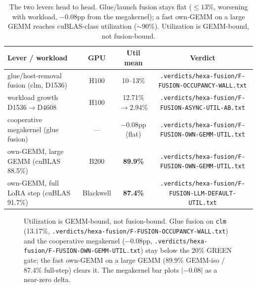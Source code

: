 \documentclass[11pt,a4paper]{article}
\newcommand{\vd}[1]{\texttt{.verdicts/hexa-fusion/#1.txt}}
\begin{document}
\begin{table}[h]
\centering
\small
\begin{tabular}{lccc}
\toprule
\textbf{Lever / workload} & \textbf{GPU} & \textbf{Util mean} & \textbf{Verdict} \\
\midrule
glue/host-removal fusion (clm, D1536)    & H100 & 10--13\%           & \vd{F-FUSION-OCCUPANCY-WALL} \\
\quad workload growth D1536$\to$D4608    & H100 & 12.71\%$\to$2.94\% & \vd{F-FUSION-ASYNC-UTIL-AB} \\
cooperative megakernel (glue fusion)     & ---  & $-0.08$pp (flat)   & \vd{F-FUSION-OWN-GEMM-UTIL} \\
own-GEMM, large GEMM (cuBLAS 88.5\%)     & B200 & \textbf{89.9\%}    & \vd{F-FUSION-OWN-GEMM-UTIL} \\
own-GEMM, full LoRA step (cuBLAS 91.7\%) & Blackwell & \textbf{87.4\%} & \vd{F-FUSION-LLM-DEFAULT-UTIL} \\
\bottomrule
\end{tabular}
\caption{The two levers head to head. Glue/launch fusion stays flat ($\leq 13\%$,
worsening with workload, $-0.08$pp from the megakernel); a fast own-GEMM on a
large GEMM reaches cuBLAS-class utilization ($\sim$90\%). Utilization is
GEMM-bound, not fusion-bound.}
\label{tab:results}
\end{table}

\begin{figure}[h]
\centering
{}
\caption{Utilization is GEMM-bound, not fusion-bound. Glue fusion on \texttt{clm}
(13.17\%, \vd{F-FUSION-OCCUPANCY-WALL}) and the cooperative megakernel
($-0.08$pp, \vd{F-FUSION-OWN-GEMM-UTIL}) stay below the 20\% GREEN gate; the fast
own-GEMM on a large GEMM (89.9\% GEMM-iso / 87.4\% full-step) clears it. The
megakernel bar plots $|{-0.08}|$ as a near-zero delta.}
\label{fig:headline}
\end{figure}
\end{document}
